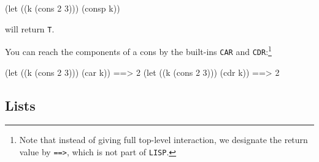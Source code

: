 \documentclass[a4paper,11pt]{article}
\begin{document}
\begin{uenum}
\begin{lispcode}
(let ((k (cons 2 3)))
    (consp k))
\end{lispcode}

will return \Verb+T+.

You can reach the components of a cons by the built-ins \Verb+CAR+ and \Verb+CDR+:\footnote{Note that instead of giving full top-level interaction, we designate the return value by \Verb+==>+, which is not part of \Verb+LISP+.}

\begin{lispcode}
(let ((k (cons 2 3))) (car k)) ==> 2 
(let ((k (cons 2 3))) (cdr k)) ==> 2 
\end{lispcode}

\end{uenum}

\subsection{Lists}
\end{document}
